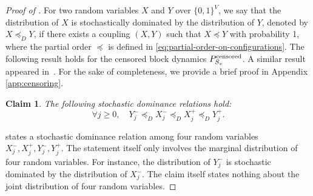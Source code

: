 \documentclass[11pt]{amsart}
\newtheorem{claim}[theorem]{Claim}
\theoremstyle{definition}
\theoremstyle{remark}
\begin{document}
\begin{proof}[Proof of ]
For two random variables $X$ and $Y$ over $\{0,1\}^V$, we say that the distribution of $X$ is stochastically dominated by the distribution of $Y$, denoted by $X \preceq_D Y$, if there exists a coupling $(X,Y)$ such that $X \preceq Y$ with probability 1, where the partial order $\preceq$ is defined in \eqref{eq:partial-order-on-configurations}.
The following result holds for the censored block dynamics $P_{S_v}^{\textnormal{censored}}$. 
A similar result appeared in~\cite[Theorem 7]{BlancaCV20}. For the sake of completeness, we provide a brief proof in Appendix \ref{app:censoring}.
\begin{claim}\label{claim:censoring}
  The following stochastic dominance relations hold:
  \[\forall j \geq 0, \quad Y_j^-\preceq_D X_j^- \preceq_D X_j^+\preceq_D Y_j^+.\] 
\end{claim}

 states a stochastic dominance relation among four random variables $X_j^-, X_j^+, Y_j^-, Y_j^+$. The statement itself only involves the marginal distribution of four random variables. For instance, the distribution of $Y^-_j$ is stochastic dominated by the distribution of $X_j^-$. The claim itself states nothing about the joint distribution of four random variables.


\end{proof}
\end{document}
